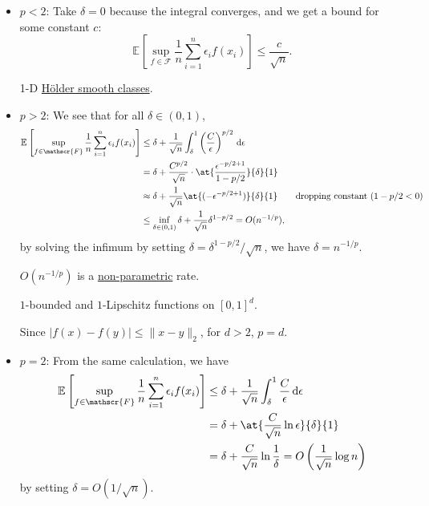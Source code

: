 \begin{itemize}
	\item \(p < 2\): Take \(\delta = 0\) because the integral converges, and we get a bound for some constant \(c\):
	      \[
		      \mathbb{E}_{}\left[\sup _{f\in \mathscr{F} } \frac{1}{n}\sum_{i=1}^{n} \epsilon _i f(x_i) \right] \leq \frac{c}{\sqrt{n} }.
	      \]
	      \begin{eg}
		      1-D \hyperref[def:Holder-smooth-function-class]{Hölder smooth classes}.
	      \end{eg}
	\item \(p > 2\): We see that for all \(\delta \in (0, 1)\),
	      \begin{align*}
		      \mathbb{E}_{}\left[\sup _{f\in \mathscr{F} } \frac{1}{n}\sum_{i=1}^{n} \epsilon _i f(x_i) \right]
		       & \leq \delta + \frac{1}{\sqrt{n} } \int_{\delta }^{1} \left( \frac{C}{\epsilon } \right) ^{p / 2} \,\mathrm{d}\epsilon        \\
		       & = \delta + \frac{C^{p / 2}}{\sqrt{n} } \cdot \at{ \frac{\epsilon ^{-p / 2 + 1}}{1 - p / 2}}{\delta }{1}                      \\
		       & \approx \delta + \frac{1}{\sqrt{n} } \at{(-\epsilon ^{-p / 2 + 1})}{\delta }{1} \tag*{dropping constant (\(1 - p / 2 < 0\))} \\
		       & \leq \inf _{\delta \in (0, 1)} \delta + \frac{1}{\sqrt{n} } \delta ^{1 - p / 2}
		      = O(n^{-1 / p}),
	      \end{align*}
	      by solving the infimum by setting \(\delta = \delta ^{1 - p / 2} / \sqrt{n} \), we have \(\delta = n^{-1 / p}\).
	      \begin{remark}
		      \(O(n^{-1 / p})\) is a \hyperref[def:non-parametric]{non-parametric} rate.
	      \end{remark}

	      \begin{eg}
		      \(1\)-bounded and \(1\)-Lipschitz functions on \([0, 1]^d\).
	      \end{eg}
	      \begin{explanation}
		      Since \(\vert f(x) - f(y) \vert \leq \lVert x - y \rVert _2\), for \(d > 2\), \(p = d\).
	      \end{explanation}
	\item \(p = 2\): From the same calculation, we have
	      \begin{align*}
		      \mathbb{E}_{}\left[\sup _{f\in \mathscr{F} } \frac{1}{n}\sum_{i=1}^{n} \epsilon _i f(x_i) \right]
		       & \leq \delta + \frac{1}{\sqrt{n} } \int_{\delta }^{1} \frac{C}{\epsilon } \,\mathrm{d}\epsilon \\
		       & = \delta + \at{\frac{C}{\sqrt{n} } \ln \epsilon}{\delta }{1}                                  \\
		       & = \delta + \frac{C}{\sqrt{n} } \ln \frac{1}{\delta}
		      = O\left( \frac{1}{\sqrt{n} } \log n \right)
	      \end{align*}
	      by setting \(\delta = O(1 / \sqrt{n} )\).
\end{itemize}

